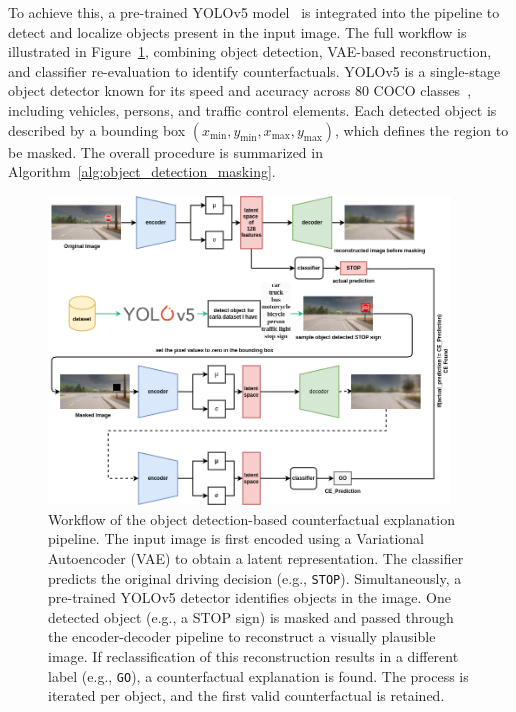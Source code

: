 To achieve this, a pre-trained YOLOv5 model~\cite{jocher2020yolov5} is integrated into the pipeline to detect and localize objects present in the input image. The full workflow is illustrated in Figure~\ref{fig:object_detection_workflow}, combining object detection, VAE-based reconstruction, and classifier re-evaluation to identify counterfactuals. YOLOv5 is a single-stage object detector known for its speed and accuracy across 80 COCO classes~\cite{lin2015microsoftcococommonobjects}, including vehicles, persons, and traffic control elements. Each detected object is described by a bounding box $(x_{\min}, y_{\min}, x_{\max}, y_{\max})$, which defines the region to be masked. The overall procedure is summarized in Algorithm~\ref{alg:object_detection_masking}.

\begin{figure}
    \centering
    \includegraphics[width=0.95\textwidth]{img//masking//object_detection/object_detection_based_masking_flow.drawio.png}
    \caption{
Workflow of the object detection-based counterfactual explanation pipeline. The input image is first encoded using a Variational Autoencoder (VAE) to obtain a latent representation. The classifier predicts the original driving decision (e.g., \texttt{STOP}). Simultaneously, a pre-trained YOLOv5 detector identifies objects in the image. One detected object (e.g., a STOP sign) is masked and passed through the encoder-decoder pipeline to reconstruct a visually plausible image. If reclassification of this reconstruction results in a different label (e.g., \texttt{GO}), a counterfactual explanation is found. The process is iterated per object, and the first valid counterfactual is retained.
}
\label{fig:object_detection_workflow}
\end{figure}

